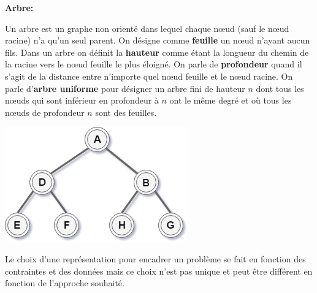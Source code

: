 {\setlength{\parindent}{0cm}\textbf{Arbre:}}

Un arbre est un graphe non orienté dans lequel chaque nœud (sauf le nœud racine) n'a qu'un seul parent. 
On désigne comme \textbf{feuille} un nœud n'ayant aucun fils.
Dans un arbre on définit la \textbf{hauteur} comme étant la longueur du chemin de la racine vers le nœud feuille le plus éloigné. On parle de \textbf{profondeur} quand il s'agit de la distance entre n'importe quel nœud feuille et le nœud racine.
On parle d'\textbf{arbre uniforme} pour désigner un arbre fini de hauteur $n$ dont tous les nœuds qui sont inférieur en profondeur à $n$ ont le même degré et où tous les nœuds de profondeur $n$ sont des feuilles.

\begin{center}
    \includegraphics[scale=0.6]{../ressources/images/example_tree.png}
\end{center}



Le choix d'une représentation pour encadrer un problème se fait en fonction des contraintes et des données mais ce choix n'est pas unique et peut être différent en fonction de l'approche souhaité.

